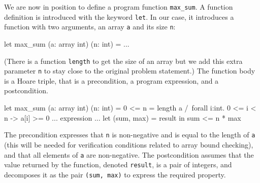 We are now in position to define a program function
\verb|max_sum|. A function definition is introduced with the keyword
\texttt{let}. In our case, it introduces a function with two arguments,
an array \texttt{a} and its size \texttt{n}:
\begin{whycode}
  let max_sum (a: array int) (n: int) = ...
\end{whycode}
(There is a function \texttt{length} to get the size of an array but
we add this extra parameter \texttt{n} to stay close to the original
problem statement.) The function body is a Hoare triple, that is a
precondition, a program expression, and a postcondition.
\begin{whycode}
  let max_sum (a: array int) (n: int) =
    { 0 <= n = length a /\ forall i:int. 0 <= i < n -> a[i] >= 0 }
     ... expression ...
    { let (sum, max) = result in sum <= n * max }
\end{whycode}
The precondition expresses that \texttt{n} is non-negative and is
equal to the length of \texttt{a} (this will be needed for
verification conditions related to array bound checking), and that all
elements of \texttt{a} are non-negative.
The postcondition assumes that the value returned by the function,
denoted \texttt{result}, is a pair of integers, and decomposes it as
the pair \texttt{(sum, max)} to express the required property.

